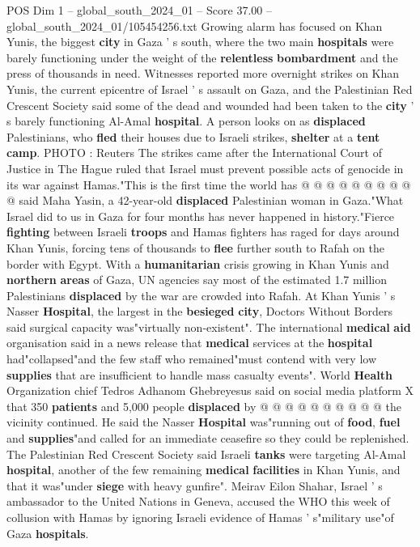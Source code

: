 \begin{textsample}{POS Dim 1 – global\_south\_2024\_01 – Score 37.00 – global\_south\_2024\_01/105454256.txt}
Growing alarm has focused on Khan Yunis, the biggest \textbf{city} in Gaza ' s south, where the two main \textbf{hospitals} were barely functioning under the weight of the \textbf{relentless} \textbf{bombardment} and the press of thousands in need.
Witnesses reported more overnight strikes on Khan Yunis, the current epicentre of Israel ' s assault on Gaza, and the Palestinian Red Crescent Society said some of the dead and wounded had been taken to the \textbf{city} ' s barely functioning Al-Amal \textbf{hospital}.
A person looks on as \textbf{displaced} Palestinians, who \textbf{fled} their houses due to Israeli strikes, \textbf{shelter} at a \textbf{tent} \textbf{camp}.
PHOTO : Reuters The strikes came after the International Court of Justice in The Hague ruled that Israel must prevent possible acts of genocide in its war against Hamas."This is the first time the world has @ @ @ @ @ @ @ @ @ @ said Maha Yasin, a 42-year-old \textbf{displaced} Palestinian woman in Gaza."What Israel did to us in Gaza for four months has never happened in history."Fierce \textbf{fighting} between Israeli \textbf{troops} and Hamas fighters has raged for days around Khan Yunis, forcing tens of thousands to \textbf{flee} further south to Rafah on the border with Egypt.
With a \textbf{humanitarian} crisis growing in Khan Yunis and \textbf{northern} \textbf{areas} of Gaza, UN agencies say most of the estimated 1.7 million Palestinians \textbf{displaced} by the war are crowded into Rafah.
At Khan Yunis ' s Nasser \textbf{Hospital}, the largest in the \textbf{besieged} \textbf{city}, Doctors Without Borders said surgical capacity was"virtually non-existent".
The international \textbf{medical} \textbf{aid} organisation said in a news release that \textbf{medical} services at the \textbf{hospital} had"collapsed"and the few staff who remained"must contend with very low \textbf{supplies} that are insufficient to handle mass casualty events".
World \textbf{Health} Organization chief Tedros Adhanom Ghebreyesus said on social media platform X that 350 \textbf{patients} and 5,000 people \textbf{displaced} by @ @ @ @ @ @ @ @ @ @ the vicinity continued.
He said the Nasser \textbf{Hospital} was"running out of \textbf{food}, \textbf{fuel} and \textbf{supplies}"and called for an immediate ceasefire so they could be replenished.
The Palestinian Red Crescent Society said Israeli \textbf{tanks} were targeting Al-Amal \textbf{hospital}, another of the few remaining \textbf{medical} \textbf{facilities} in Khan Yunis, and that it was"under \textbf{siege} with heavy gunfire".
Meirav Eilon Shahar, Israel ' s ambassador to the United Nations in Geneva, accused the WHO this week of collusion with Hamas by ignoring Israeli evidence of Hamas ' s"military use"of Gaza \textbf{hospitals}.

\end{textsample}
